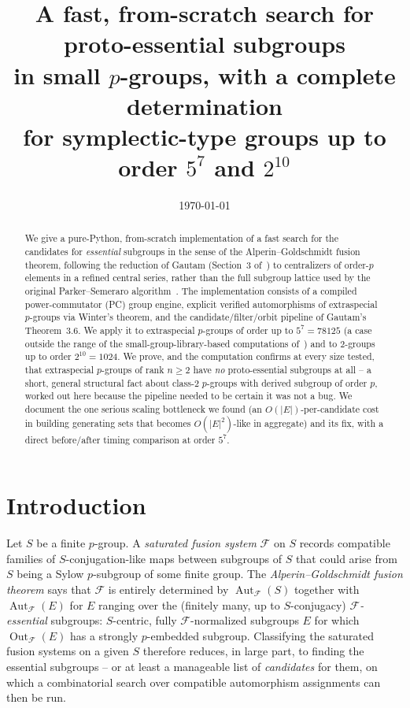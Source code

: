 \documentclass[11pt]{article}
\title{A fast, from-scratch search for proto-essential subgroups\\
  in small $p$-groups, with a complete determination\\
  for symplectic-type groups up to order $5^7$ and $2^{10}$}
\author{}
\date{\today}
\theoremstyle{remark}
\begin{document}
\maketitle

\begin{abstract}
We give a pure-Python, from-scratch implementation of a fast search for the
candidates for \emph{essential} subgroups in the sense of the
Alperin--Goldschmidt fusion theorem, following the reduction of Gautam
(Section~3 of~\cite{gautam2024}) to centralizers of order-$p$ elements in a
refined central series, rather than the full subgroup lattice used by the
original Parker--Semeraro algorithm~\cite{parkersemeraro}. The implementation
consists of a compiled power-commutator (PC) group engine, explicit verified
automorphisms of extraspecial $p$-groups via Winter's theorem, and the
candidate/filter/orbit pipeline of Gautam's Theorem~3.6. We apply it to
extraspecial $p$-groups of order up to $5^7 = 78125$ (a case outside the
range of the small-group-library-based computations
of~\cite{parkersemeraro}) and to $2$-groups up to order $2^{10}=1024$. We
prove, and the computation confirms at every size tested, that extraspecial
$p$-groups of rank $n \ge 2$ have \emph{no} proto-essential subgroups at all
-- a short, general structural fact about class-$2$ $p$-groups with derived
subgroup of order $p$, worked out here because the pipeline needed to be
certain it was not a bug. We document the one serious scaling bottleneck we
found (an $O(|E|)$-per-candidate cost in building generating sets that
becomes $O(|E|^2)$-like in aggregate) and its fix, with a direct
before/after timing comparison at order $5^7$.
\end{abstract}

\tableofcontents

\section{Introduction}

Let $S$ be a finite $p$-group. A \emph{saturated fusion system} $\mathcal{F}$
on $S$ records compatible families of $S$-conjugation-like maps between
subgroups of $S$ that could arise from $S$ being a Sylow $p$-subgroup of some
finite group. The \emph{Alperin--Goldschmidt fusion theorem} says that
$\mathcal{F}$ is entirely determined by $\operatorname{Aut}_{\mathcal{F}}(S)$
together with $\operatorname{Aut}_{\mathcal{F}}(E)$ for $E$ ranging over the
(finitely many, up to $S$-conjugacy) \emph{$\mathcal{F}$-essential}
subgroups: $S$-centric, fully $\mathcal{F}$-normalized subgroups $E$ for
which $\operatorname{Out}_{\mathcal{F}}(E)$ has a strongly $p$-embedded
subgroup. Classifying the saturated fusion systems on a given $S$ therefore
reduces, in large part, to finding the essential subgroups -- or at least a
manageable list of \emph{candidates} for them, on which a combinatorial
search over compatible automorphism assignments can then be run.
\end{document}
